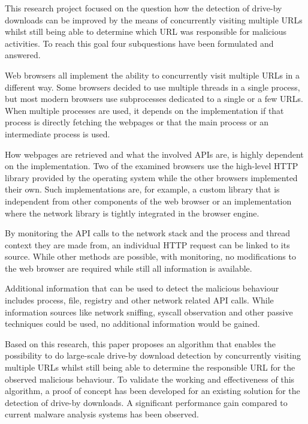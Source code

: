 This research project focused on the question how the detection of drive-by downloads can be improved by the means of concurrently visiting multiple URLs whilst still being able to determine which URL was responsible for malicious activities. To reach this goal four subquestions have been formulated and answered.

Web browsers all implement the ability to concurrently visit multiple URLs in a different way. Some browsers decided to use multiple threads in a single process, but most modern browsers use subprocesses dedicated to a single or a few URLs. When multiple processes are used, it depends on the implementation if that process is directly fetching the webpages or that the main process or an intermediate process is used.

How webpages are retrieved and what the involved APIs are, is highly dependent on the implementation. Two of the examined browsers use the high-level HTTP library provided by the operating system while the other browsers implemented their own. Such implementations are, for example, a custom library that is independent from other components of the web browser or an implementation where the network library is tightly integrated in the browser engine.

By monitoring the API calls to the network stack and the process and thread context they are made from, an individual HTTP request can be linked to its source. While other methods are possible, with monitoring, no modifications to the web browser are required while still all information is available.

Additional information that can be used to detect the malicious behaviour includes process, file, registry and other network related API calls. While information sources like network sniffing, syscall observation and other passive techniques could be used, no additional information would be gained.

Based on this research, this paper proposes an algorithm that enables the possibility to do large-scale drive-by download detection by concurrently visiting multiple URLs whilst still being able to determine the responsible URL for the observed malicious behaviour. To validate the working and effectiveness of this algorithm, a proof of concept has been developed for an existing solution for the detection of drive-by downloads. A significant performance gain compared to current malware analysis systems has been observed.
